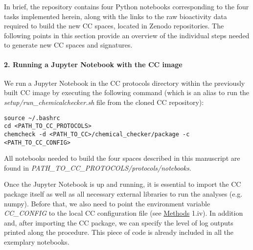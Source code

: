 In brief, the repository contains four Python notebooks corresponding to the four tasks implemented herein, along with the links to the raw bioactivity data required to build the new CC spaces, located in Zenodo repositories. The following points in this section provide an overview of the individual steps needed to generate new CC spaces and signatures.




\paragraph{2. Running a Jupyter Notebook with the CC image} \leavevmode

We run a Jupyter Notebook in the CC protocols directory within the previously built CC image by executing the following command (which is an alias to run the \textit{setup/run\_chemicalchecker.sh} file from the cloned CC repository): \\

\begin{lstlisting}
source ~/.bashrc
cd <PATH_TO_CC_PROTOCOLS>
chemcheck -d <PATH_TO_CC>/chemical_checker/package -c <PATH_TO_CC_CONFIG>
\end{lstlisting}

All notebooks needed to build the four spaces described in this manuscript are found in \textit{PATH\_TO\_CC\_PROTOCOLS/protocols/notebooks}.

Once the Jupyter Notebook is up and running, it is essential to import the CC package itself as well as all necessary external libraries to run the analyses (e.g. numpy). Before that, we also need to point the environment variable \textit{CC\_CONFIG} to the local CC configuration file (see \hyperref[Protocols_Methods]{Methods} 1.iv). In addition and, after importing the CC package, we can specify the level of log outputs printed along the procedure. This piece of code is already included in all the exemplary notebooks. \\

